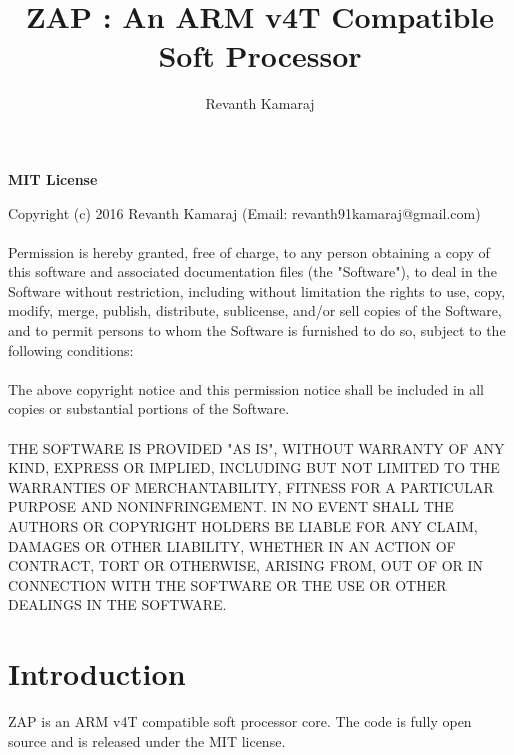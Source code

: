 \documentclass[11pt]{article}
\begin{document}
\sloppy

\title{ ZAP : An ARM v4T Compatible Soft Processor }
\author{Revanth Kamaraj}

\begin{titlepage}
\clearpage\maketitle
\thispagestyle{empty}
\maketitle
\end{titlepage}

\begin{center}
\textbf{MIT License} \\
\end{center}
Copyright (c) 2016 Revanth Kamaraj (Email: revanth91kamaraj@gmail.com) \\\\
Permission is hereby granted, free of charge, to any person obtaining a copy
of this software and associated documentation files (the "Software"), to deal
in the Software without restriction, including without limitation the rights
to use, copy, modify, merge, publish, distribute, sublicense, and/or sell
copies of the Software, and to permit persons to whom the Software is
furnished to do so, subject to the following conditions: \\\\
The above copyright notice and this permission notice shall be included in all
copies or substantial portions of the Software. \\\\
THE SOFTWARE IS PROVIDED "AS IS", WITHOUT WARRANTY OF ANY KIND, EXPRESS OR
IMPLIED, INCLUDING BUT NOT LIMITED TO THE WARRANTIES OF MERCHANTABILITY,
FITNESS FOR A PARTICULAR PURPOSE AND NONINFRINGEMENT. IN NO EVENT SHALL THE
AUTHORS OR COPYRIGHT HOLDERS BE LIABLE FOR ANY CLAIM, DAMAGES OR OTHER
LIABILITY, WHETHER IN AN ACTION OF CONTRACT, TORT OR OTHERWISE, ARISING FROM,
OUT OF OR IN CONNECTION WITH THE SOFTWARE OR THE USE OR OTHER DEALINGS IN THE
SOFTWARE.

\pagebreak
\section{Introduction}

ZAP is an ARM{\textregistered} v4T compatible soft processor core. The code is
fully open source and is released under the MIT license.
\end{document}
